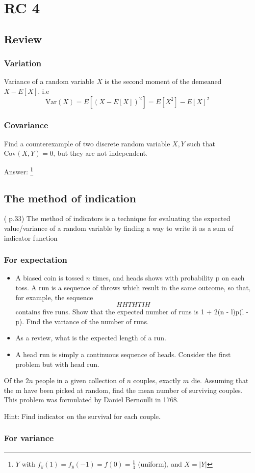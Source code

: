 \chapter{RC 4}

\section{Review}
\subsection{Variation}
Variance of a random variable \(X\) is the second moment of the demeaned \(X-E[X]\), i.e
\[
    \text{Var} (X) = E[(X-E[X])^2] = E[X^2] - E[X]^2
\]
\subsection{Covariance}
\begin{exercise}
    Find a counterexample of two discrete random variable \(X,Y\) such that \(\text{Cov}(X,Y) = 0  \), but they are not independent. 
\end{exercise}
Answer: \footnote[1]{\(Y\) with \(f_y(1) = f_y(-1) = f(0) = \frac{1}{3}\) (uniform), and \(X = |Y|\) } 
\section{The method of indication}
(\cite{Und_Chatterjee} p.33) The method of indicators is a technique for evaluating the expected value/variance of a random variable by finding a way to write it as a sum of indicator function
\subsection{For expectation}
\begin{eg}
   \begin{itemize}
       \item A biased coin is tossed \(n\)  times, and heads shows with probability p on each toss. A run is a
sequence of throws which result in the same outcome, so that, for example, the sequence 
\[
HHTHTIH
\]    
contains five runs. Show that the expected number of runs is 1 + 2(n - l)p(l - p). Find the variance
of the number of runs. 
        \item As a review, what is the expected length of a run. 
        \item A head run is simply a continuous sequence of heads. Consider the first problem but with head run.
   \end{itemize} 
\end{eg}
\begin{exercise}
    Of the \(2n\)  people in a given collection of \(n\)  couples, exactly \(m\)  die. Assuming that the m have
been picked at random, find the mean number of surviving couples. This problem was formulated by
Daniel Bernoulli in 1768.\\
\end{exercise}
Hint: Find indicator on the survival for each couple.
\subsection{For variance}
